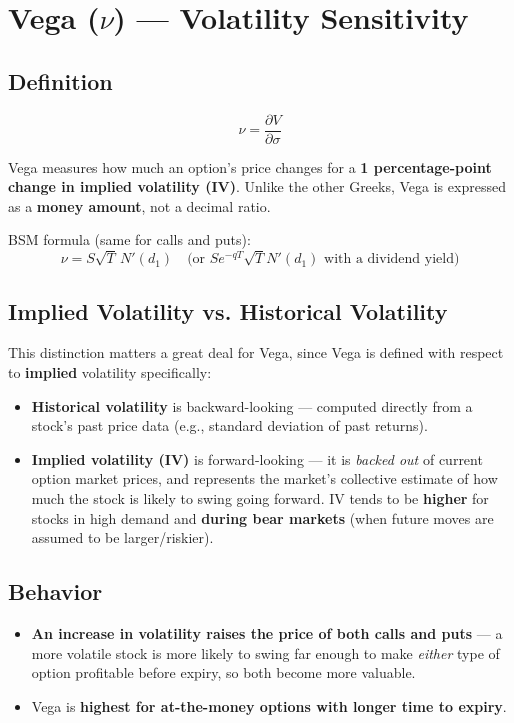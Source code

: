 \documentclass[12pt,openany]{book}
\theoremstyle{definition}
\theoremstyle{remark}
\begin{document}
\section{Vega (\texorpdfstring{\(\nu\)}{nu}) — Volatility Sensitivity}

\subsection{Definition}

\[
\nu = \frac{\partial V}{\partial \sigma}
\]

Vega measures how much an option's price changes for a \textbf{1 percentage-point change in implied volatility (IV)}. Unlike the other Greeks, Vega is expressed as a \textbf{money amount}, not a decimal ratio.

BSM formula (same for calls and puts):
\[
\nu = S\sqrt{T}\,N'(d_1) \quad \text{(or } Se^{-qT}\sqrt{T}N'(d_1)\text{ with a dividend yield)}
\]

\subsection{Implied Volatility vs. Historical Volatility}

This distinction matters a great deal for Vega, since Vega is defined with respect to \textbf{implied} volatility specifically:

\begin{itemize}
\item \textbf{Historical volatility} is backward-looking — computed directly from a stock's past price data (e.g., standard deviation of past returns).
\item \textbf{Implied volatility (IV)} is forward-looking — it is \emph{backed out} of current option market prices, and represents the market's collective estimate of how much the stock is likely to swing going forward. IV tends to be \textbf{higher} for stocks in high demand and \textbf{during bear markets} (when future moves are assumed to be larger/riskier).
\end{itemize}

\subsection{Behavior}

\begin{itemize}
\item \textbf{An increase in volatility raises the price of both calls and puts} — a more volatile stock is more likely to swing far enough to make \emph{either} type of option profitable before expiry, so both become more valuable.
\item Vega is \textbf{highest for at-the-money options with longer time to expiry}.
\end{itemize}
\end{document}

